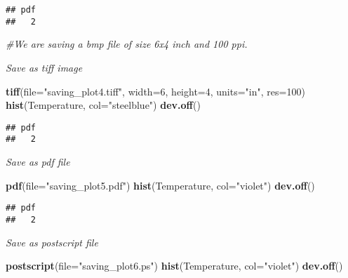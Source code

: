\documentclass[]{book}
\newenvironment{Shaded}{\begin{snugshade}}{\end{snugshade}}
\newcommand{\KeywordTok}[1]{\textcolor[rgb]{0.13,0.29,0.53}{\textbf{#1}}}
\newcommand{\DataTypeTok}[1]{\textcolor[rgb]{0.13,0.29,0.53}{#1}}
\newcommand{\DecValTok}[1]{\textcolor[rgb]{0.00,0.00,0.81}{#1}}
\newcommand{\StringTok}[1]{\textcolor[rgb]{0.31,0.60,0.02}{#1}}
\newcommand{\CommentTok}[1]{\textcolor[rgb]{0.56,0.35,0.01}{\textit{#1}}}
\newcommand{\NormalTok}[1]{#1}
\theoremstyle{definition}
\theoremstyle{definition}
\theoremstyle{definition}
\theoremstyle{remark}
\begin{document}
\begin{verbatim}
## pdf 
##   2
\end{verbatim}

\begin{Shaded}
\begin{Highlighting}[]
\CommentTok{#We are saving a bmp file of size 6x4 inch and 100 ppi.}
\end{Highlighting}
\end{Shaded}

\emph{Save as tiff image}

\begin{Shaded}
\begin{Highlighting}[]
\KeywordTok{tiff}\NormalTok{(}\DataTypeTok{file=}\StringTok{"saving_plot4.tiff"}\NormalTok{,}
   \DataTypeTok{width=}\DecValTok{6}\NormalTok{, }\DataTypeTok{height=}\DecValTok{4}\NormalTok{, }\DataTypeTok{units=}\StringTok{"in"}\NormalTok{, }\DataTypeTok{res=}\DecValTok{100}\NormalTok{)}
\KeywordTok{hist}\NormalTok{(Temperature, }\DataTypeTok{col=}\StringTok{"steelblue"}\NormalTok{)}
\KeywordTok{dev.off}\NormalTok{()}
\end{Highlighting}
\end{Shaded}

\begin{verbatim}
## pdf 
##   2
\end{verbatim}

\emph{Save as pdf file}

\begin{Shaded}
\begin{Highlighting}[]
\KeywordTok{pdf}\NormalTok{(}\DataTypeTok{file=}\StringTok{"saving_plot5.pdf"}\NormalTok{)}
\KeywordTok{hist}\NormalTok{(Temperature, }\DataTypeTok{col=}\StringTok{"violet"}\NormalTok{)}
\KeywordTok{dev.off}\NormalTok{()}
\end{Highlighting}
\end{Shaded}

\begin{verbatim}
## pdf 
##   2
\end{verbatim}

\emph{Save as postscript file}

\begin{Shaded}
\begin{Highlighting}[]
\KeywordTok{postscript}\NormalTok{(}\DataTypeTok{file=}\StringTok{"saving_plot6.ps"}\NormalTok{)}
\KeywordTok{hist}\NormalTok{(Temperature, }\DataTypeTok{col=}\StringTok{"violet"}\NormalTok{)}
\KeywordTok{dev.off}\NormalTok{()}
\end{Highlighting}
\end{Shaded}
\end{document}
